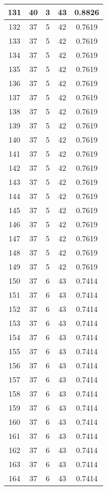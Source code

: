 \documentclass[letterpaper, 12pt]{article}
\begin{document}
\begin{longtable}{|c|c|c|c|c|}
\hline
131 & 40 & 3 & 43 & 0.8826 \\
\hline
132 & 37 & 5 & 42 & 0.7619 \\
\hline
133 & 37 & 5 & 42 & 0.7619 \\
\hline
134 & 37 & 5 & 42 & 0.7619 \\
\hline
135 & 37 & 5 & 42 & 0.7619 \\
\hline
136 & 37 & 5 & 42 & 0.7619 \\
\hline
137 & 37 & 5 & 42 & 0.7619 \\
\hline
138 & 37 & 5 & 42 & 0.7619 \\
\hline
139 & 37 & 5 & 42 & 0.7619 \\
\hline
140 & 37 & 5 & 42 & 0.7619 \\
\hline
141 & 37 & 5 & 42 & 0.7619 \\
\hline
142 & 37 & 5 & 42 & 0.7619 \\
\hline
143 & 37 & 5 & 42 & 0.7619 \\
\hline
144 & 37 & 5 & 42 & 0.7619 \\
\hline
145 & 37 & 5 & 42 & 0.7619 \\
\hline
146 & 37 & 5 & 42 & 0.7619 \\
\hline
147 & 37 & 5 & 42 & 0.7619 \\
\hline
148 & 37 & 5 & 42 & 0.7619 \\
\hline
149 & 37 & 5 & 42 & 0.7619 \\
\hline
150 & 37 & 6 & 43 & 0.7414 \\
\hline
151 & 37 & 6 & 43 & 0.7414 \\
\hline
152 & 37 & 6 & 43 & 0.7414 \\
\hline
153 & 37 & 6 & 43 & 0.7414 \\
\hline
154 & 37 & 6 & 43 & 0.7414 \\
\hline
155 & 37 & 6 & 43 & 0.7414 \\
\hline
156 & 37 & 6 & 43 & 0.7414 \\
\hline
157 & 37 & 6 & 43 & 0.7414 \\
\hline
158 & 37 & 6 & 43 & 0.7414 \\
\hline
159 & 37 & 6 & 43 & 0.7414 \\
\hline
160 & 37 & 6 & 43 & 0.7414 \\
\hline
161 & 37 & 6 & 43 & 0.7414 \\
\hline
162 & 37 & 6 & 43 & 0.7414 \\
\hline
163 & 37 & 6 & 43 & 0.7414 \\
\hline
164 & 37 & 6 & 43 & 0.7414 \\

\end{longtable}
\end{document}
